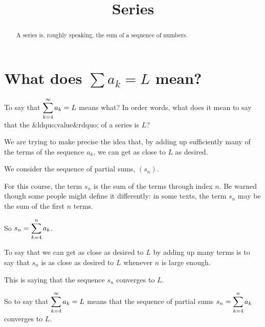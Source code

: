 \documentclass{ximera}
\title{Series}
\begin{document}
\begin{abstract}
  A series is, roughly speaking, the sum of a sequence of numbers.
\end{abstract}

\maketitle

\section{What does $\displaystyle\sum a_k = L$ mean?}

\begin{question}
  To say that \(\displaystyle\displaystyle\sum_{k=4}^\infty a_k = L\) means what?  In order words, what does it mean to say that the &ldquo;value&rdquo; of a series is \(L\)?
  \begin{solution}
    \begin{hint}
      We are trying to make precise the idea that, by adding up sufficiently many of the terms of the sequence \(a_k\), we can get as close to \(L\) as desired.
    \end{hint}
    \begin{hint}
      We consider the sequence of partial sums, \((s_n)\).
    \end{hint}
    \begin{hint}
      For this course, the term \(s_n\) is the sum of the terms through index \(n\).  Be warned though some people might define it differently: in some texts, the term \(s_n\) may be the sum of the first \(n\) terms.
    \end{hint}
    \begin{hint}
      So \(s_n = \displaystyle\displaystyle\sum_{k=4}^n a_k\).
    \end{hint}
    \begin{hint}
      To say that we can get as close as desired to \(L\) by adding up many terms is to say that \(s_n\) is as close as desired to \(L\) whenever \(n\) is large enough.
    \end{hint}
    \begin{hint}
      This is saying that the sequence \(s_n\) converges to \(L\).
    \end{hint}
    \begin{hint}
      So to say that \(\displaystyle\displaystyle\sum_{k=4}^\infty a_k = L\) means that the sequence of partial sums \(s_n = \displaystyle\displaystyle\sum_{k=4}^n a_k \) converges to \(L\).
      

\end{hint}
\end{solution}
\end{question}
\end{document}
